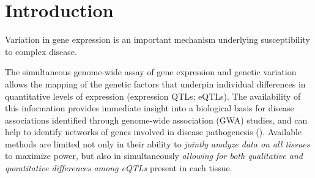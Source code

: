 \section*{Introduction}
Variation in gene expression is an important mechanism underlying susceptibility to complex disease.

The simultaneous genome-wide assay of gene expression and genetic variation allows the mapping of the genetic factors that underpin individual differences in quantitative levels of expression (expression QTLs; eQTLs). 
The availability of this information provides immediate insight into a biological basis for disease associations identified through genome-wide association (GWA) studies, and can help to identify networks of genes 
involved in disease pathogenesis (\cite{nicolae_trait-associated_2010, veyrieras_high-resolution_2008}).
Available methods are limited not only in their ability to {\it jointly analyze data on all tissues} to maximize power, but also in simultaneously {\it allowing for both qualitative and quantitative differences among eQTLs} present in each tissue.

